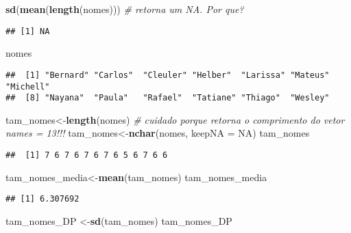 \documentclass[]{article}
\newenvironment{Shaded}{\begin{snugshade}}{\end{snugshade}}
\newcommand{\KeywordTok}[1]{\textcolor[rgb]{0.13,0.29,0.53}{\textbf{#1}}}
\newcommand{\DataTypeTok}[1]{\textcolor[rgb]{0.13,0.29,0.53}{#1}}
\newcommand{\CommentTok}[1]{\textcolor[rgb]{0.56,0.35,0.01}{\textit{#1}}}
\newcommand{\OtherTok}[1]{\textcolor[rgb]{0.56,0.35,0.01}{#1}}
\newcommand{\NormalTok}[1]{#1}
\begin{document}
\begin{Shaded}
\begin{Highlighting}[]
\KeywordTok{sd}\NormalTok{(}\KeywordTok{mean}\NormalTok{(}\KeywordTok{length}\NormalTok{(nomes))) }\CommentTok{# retorna um NA. Por que?}
\end{Highlighting}
\end{Shaded}

\begin{verbatim}
## [1] NA
\end{verbatim}

\begin{Shaded}
\begin{Highlighting}[]
\NormalTok{nomes}
\end{Highlighting}
\end{Shaded}

\begin{verbatim}
##  [1] "Bernard" "Carlos"  "Cleuler" "Helber"  "Larissa" "Mateus"  "Michell"
##  [8] "Nayana"  "Paula"   "Rafael"  "Tatiane" "Thiago"  "Wesley"
\end{verbatim}

\begin{Shaded}
\begin{Highlighting}[]
\NormalTok{tam_nomes<-}\KeywordTok{length}\NormalTok{(nomes) }\CommentTok{# cuidado porque retorna o comprimento do vetor names = 13!!!}
\NormalTok{tam_nomes<-}\KeywordTok{nchar}\NormalTok{(nomes, }\DataTypeTok{keepNA =} \OtherTok{NA}\NormalTok{)}
\NormalTok{tam_nomes}
\end{Highlighting}
\end{Shaded}

\begin{verbatim}
##  [1] 7 6 7 6 7 6 7 6 5 6 7 6 6
\end{verbatim}

\begin{Shaded}
\begin{Highlighting}[]
\NormalTok{tam_nomes_media<-}\KeywordTok{mean}\NormalTok{(tam_nomes)}
\NormalTok{tam_nomes_media}
\end{Highlighting}
\end{Shaded}

\begin{verbatim}
## [1] 6.307692
\end{verbatim}

\begin{Shaded}
\begin{Highlighting}[]
\NormalTok{tam_nomes_DP   <-}\KeywordTok{sd}\NormalTok{(tam_nomes)}
\NormalTok{tam_nomes_DP}
\end{Highlighting}
\end{Shaded}
\end{document}
